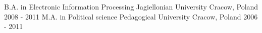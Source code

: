 

\begin{cventries}

  \cventry
    {B.A. in Electronic Information Processing}
    {Jagiellonian University}
    {Cracow, Poland}
    {2008 - 2011}
    {}
  \cventry
    {M.A. in Political science}
    {Pedagogical University}
    {Cracow, Poland}
    {2006 - 2011}
    {}

\end{cventries}
